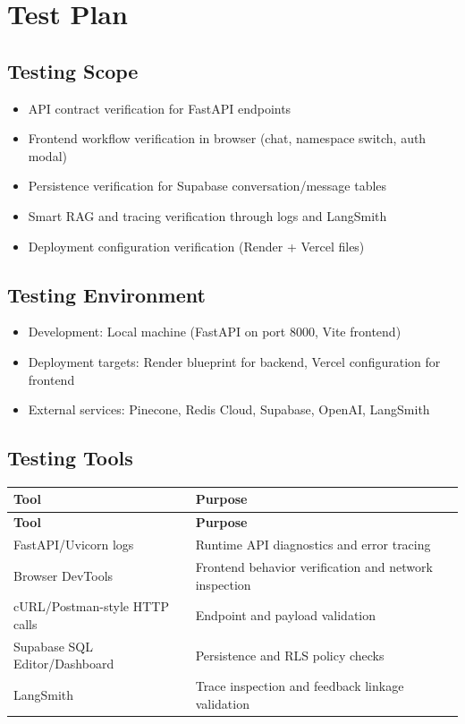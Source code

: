 \documentclass[12pt,a4paper]{book}
\numberwithin{table}{chapter}
\numberwithin{figure}{chapter}
\numberwithin{equation}{chapter}
\begin{document}
\section{Test Plan}

\subsection{Testing Scope}
\begin{itemize}
    \item API contract verification for FastAPI endpoints
    \item Frontend workflow verification in browser (chat, namespace switch, auth modal)
    \item Persistence verification for Supabase conversation/message tables
    \item Smart RAG and tracing verification through logs and LangSmith
    \item Deployment configuration verification (Render + Vercel files)
\end{itemize}

\subsection{Testing Environment}
\begin{itemize}
    \item Development: Local machine (FastAPI on port 8000, Vite frontend)
    \item Deployment targets: Render blueprint for backend, Vercel configuration for frontend
    \item External services: Pinecone, Redis Cloud, Supabase, OpenAI, LangSmith
\end{itemize}

\subsection{Testing Tools}
\begin{longtable}{|p{1.5in}|p{4in}|}
\hline
\textbf{Tool} & \textbf{Purpose}\\
\hline
\endfirsthead
\hline
\textbf{Tool} & \textbf{Purpose}\\
\hline
\endhead
\hline
FastAPI/Uvicorn logs & Runtime API diagnostics and error tracing\\
\hline
Browser DevTools & Frontend behavior verification and network inspection\\
\hline
cURL/Postman-style HTTP calls & Endpoint and payload validation\\
\hline
Supabase SQL Editor/Dashboard & Persistence and RLS policy checks\\
\hline
LangSmith & Trace inspection and feedback linkage validation\\
\hline
\end{longtable}
\end{document}
